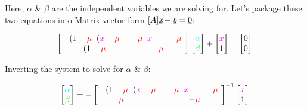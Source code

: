 Here, $\alpha$ \& $\beta$ are the independent variables we are solving for. Let's package these two equations into Matrix-vector form $[A]\underbar{\it{x}} + \underbar{\it{b}} = \underbar{0}$:

\begin{equation*}
    \begin{bmatrix}
        -\left(1 - \cred \mu \cw \right) \left(\cm x \cw + \cred \mu \cw\right)  &
        - \cred \mu \cw \left(\cm x \cw - 1 + \cred\mu\cw\right)
        \\
        - \left(1-\cred\mu\cw\right) &
        - \cred\mu\cw
    \end{bmatrix}
    \begin{bmatrix}
        \cc \alpha \\ \cg \beta
    \end{bmatrix}
    +
    \begin{bmatrix}
        \cm x \cw \\ 1
    \end{bmatrix}
    =
    \begin{bmatrix}
        0 \\ 0
    \end{bmatrix}
\end{equation*}

Inverting the system to solve for $\alpha$ \& $\beta$:

\begin{equation*}
    \begin{bmatrix}
        \cc \alpha \\ \cg \beta
    \end{bmatrix}
    = -
    \begin{bmatrix}
        -\left(1 - \cred \mu \cw \right) \left(\cm x \cw + \cred \mu \cw\right)  &
        - \cred \mu \cw \left(\cm x \cw - 1 + \cred\mu\cw\right)
        \\
        \cred\mu\cw - 1 &
        - \cred\mu\cw
    \end{bmatrix}^{-1}
    \begin{bmatrix}
        \cm x \cw \\ 1
    \end{bmatrix}
\end{equation*}